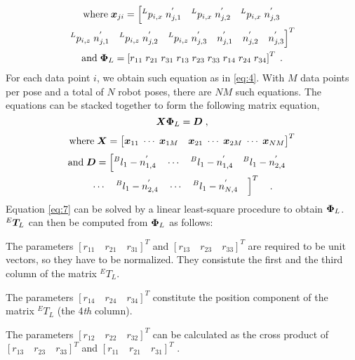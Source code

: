 \begin{multline*}
\mathrm{where} \;  \vb*{x}_{ji} = \left[{^L}p_{i,x}\;n^{'}_{j,1} \quad {^L}p_{i,x}\;n^{'}_{j,2}\quad {^L}p_{i,x}\;n^{'}_{j,3} \right. \\ 
\left. {^L}p_{i,z}\;n^{'}_{j,1}\quad {^L}p_{i,z}\;n^{'}_{j,2}\quad {^L}p_{i,z}\;n^{'}_{j,3} \quad n^{'}_{j,1} \quad n^{'}_{j,2} \quad n^{'}_{j,3} \right]^T \\
\mathrm{and} \;  \vb*{\Phi}_L= \left[r_{11} \; r_{21} \; r_{31} \; r_{13} \; r_{23} \; r_{33} \; r_{14} \; r_{24}  \; r_{34} \right] ^T \; .
\end{multline*}
For each data point $i$, we obtain such equation as in \eqref{eq:4}. With $M$ data points per pose and a total of $N$ robot poses, there are $NM$ such equations. The equations can be stacked together to form the following matrix equation,
\begin{equation}
\label{eq:7}
  \vb*{X}   \vb*{\Phi}_L= \vb*{D} \; ,
\end{equation} 
\begin{equation*}
\mathrm{where} \; \vb*{X} =\begin{bmatrix}
{\vb*{x}_{11}} \; \cdots \;{\vb*{x}_{1M}}\quad  {\vb*{x}_{21}} \; \cdots \; {\vb*{x}_{2M}}\;  \cdots \; {\vb*{x}_{NM}} 
\end{bmatrix}^T 
\end{equation*}
\begin{multline*}
\mathrm{and} \; \vb*{D} =\left[
{^B}l_1 -  n^{'}_{1,4} \quad
\cdots \quad
{^B}l_1 -  n^{'}_{1,4} \quad
{^B}l_1 -  n^{'}_{2,4} \quad
\right. \\
\left.
\cdots  \quad {^B}l_1 -  n^{'}_{2,4} \quad
\cdots \quad
{^B}l_1 -  n^{'}_{N,4} \quad  
\right]^T \quad .
\end{multline*}
Equation \eqref{eq:7} can be solved by a linear least-square procedure to obtain $\vb*{\Phi}_L$. ${^E}\vb*{T}_L$ can then be computed from $\vb*{\Phi}_L$ as follows:
\begin{compactenum}
\item The parameters $[r_{11} \quad r_{21} \quad r_{31}]^T$ and $[r_{13} \quad r_{23} \quad r_{33}]^T$ are required to be unit vectors, so they have to be normalized. They consistute the first and the third column of the matrix ${^E}T_L$.
\item The parameters $[r_{14} \quad r_{24} \quad r_{34}]^T$ constitute the position component of the matrix ${^E}T_L$ (the 4\textit{th} column).
\item The parameters $[r_{12} \quad r_{22} \quad r_{32}]^T$ can be calculated as the cross product of  $[r_{13} \quad r_{23} \quad r_{33}]^T$ and $[r_{11} \quad r_{21} \quad r_{31}]^T$ .
\end{compactenum}

